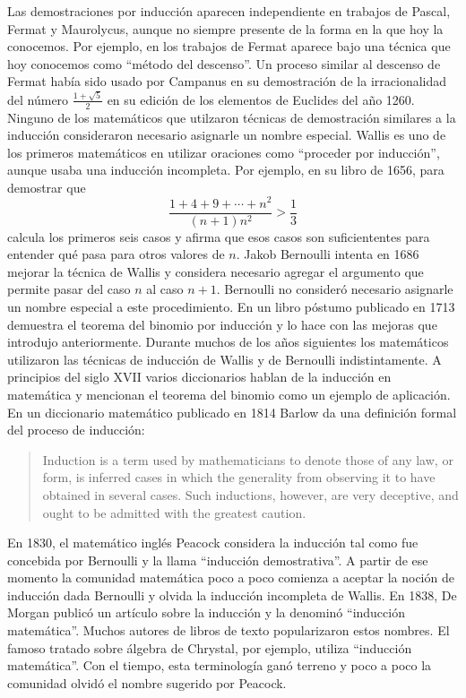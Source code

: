 Las demostraciones por inducción aparecen
independiente en trabajos de Pascal, Fermat y Maurolycus, aunque no siempre
presente de la forma en la que hoy la conocemos. Por ejemplo, en los trabajos
de Fermat aparece bajo una técnica que hoy conocemos como ``método del descenso''. 
Un proceso similar al descenso de Fermat había sido usado por Campanus en su
demostración de la irracionalidad del número $\frac{1+\sqrt{5}}{2}$ en su
edición de los elementos de Euclides del año 1260. Ninguno de los matemáticos
que utilzaron técnicas de demostración similares a la inducción consideraron
necesario asignarle un nombre especial. Wallis es uno de los primeros
matemáticos en utilizar oraciones como ``proceder por inducción'', aunque usaba
una inducción incompleta. Por ejemplo, en su libro de 1656, para demostrar que
\[
	\frac{1+4+9+\cdots+n^2}{(n+1)n^2}>\frac13
\]
calcula los primeros seis casos y afirma que esos casos son suficiententes para
entender qué pasa para otros valores de $n$. Jakob Bernoulli intenta en 1686
mejorar la técnica de Wallis y considera necesario agregar el argumento que
permite pasar del caso $n$ al caso $n+1$. Bernoulli no consideró necesario
asignarle un nombre especial a este procedimiento. En un libro póstumo
publicado en 1713 demuestra el teorema del binomio por inducción y lo hace con
las mejoras que introdujo anteriormente. Durante muchos de los años siguientes
los matemáticos utilizaron las técnicas de inducción de Wallis y de Bernoulli
indistintamente. A principios del siglo XVII varios diccionarios hablan de la
inducción en matemática y mencionan el teorema del binomio como un ejemplo de
aplicación.  En un diccionario matemático publicado en 1814 Barlow da una
definición formal del proceso de inducción:
\begin{quote}
	Induction is a term used by mathematicians to denote those of any law, or
	form, is inferred cases in which the generality from observing it to have
	obtained in several cases. Such inductions, however, are very deceptive,
	and ought to be admitted with the greatest caution.
\end{quote}
En 1830, el matemático inglés Peacock considera la inducción tal como fue
concebida por Bernoulli y la llama ``inducción demostrativa''. A partir de ese
momento la comunidad matemática poco a poco comienza a aceptar la noción de
inducción dada Bernoulli y olvida la inducción incompleta de Wallis.  En 1838,
De Morgan publicó un artículo sobre la inducción y la denominó ``inducción
matemática''. Muchos autores de libros de texto popularizaron estos nombres.
El famoso tratado sobre álgebra de Chrystal, por ejemplo, utiliza ``inducción
matemática''. Con el tiempo, esta terminología ganó terreno y poco a poco la
comunidad olvidó el nombre sugerido por Peacock. 


